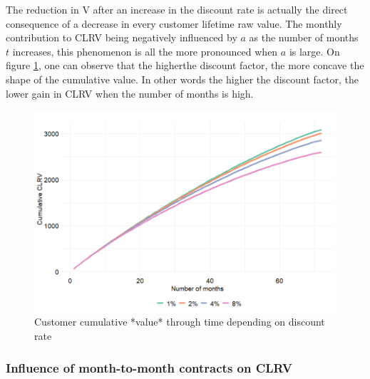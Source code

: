 \documentclass[
]{book}
\begin{document}
The reduction in V after an increase in the discount rate is actually the direct consequence of a decrease in every customer lifetime raw value. The monthly contribution to CLRV being negatively influenced by \(a\) as the number of months \(t\) increases, this phenomenon is all the more pronounced when \(a\) is large. On figure \ref{fig:clrvEvolDiscount}, one can observe that the higherthe discount factor, the more concave the shape of the cumulative value. In other words the higher the discount factor, the lower gain in CLRV when the number of months is high.

\begin{figure}

{\centering \includegraphics[width=12.5in]{./imgs/clrv_evolution_discount} 

}

\caption{Customer cumulative *value* through time depending on discount rate}\label{fig:clrvEvolDiscount}
\end{figure}

\hypertarget{influence-of-month-to-month-contracts-on-clrv}{%
\subsubsection*{Influence of month-to-month contracts on CLRV}\label{influence-of-month-to-month-contracts-on-clrv}}
\end{document}
